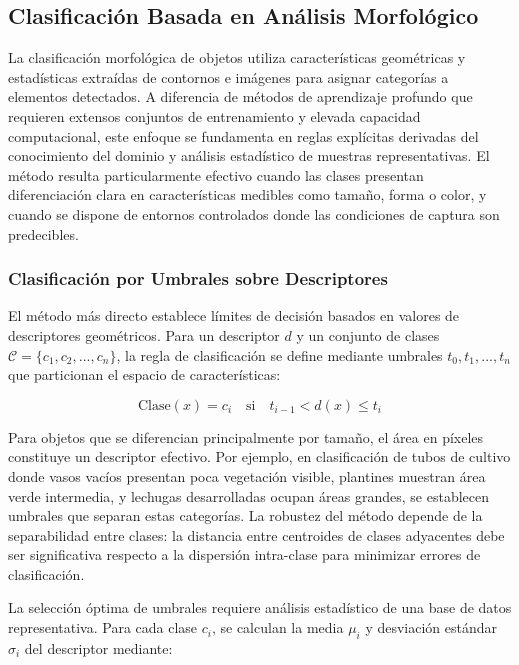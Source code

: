\subsection{Clasificación Basada en Análisis Morfológico}

La clasificación morfológica de objetos utiliza características geométricas y estadísticas extraídas de contornos e imágenes para asignar categorías a elementos detectados. A diferencia de métodos de aprendizaje profundo que requieren extensos conjuntos de entrenamiento y elevada capacidad computacional, este enfoque se fundamenta en reglas explícitas derivadas del conocimiento del dominio y análisis estadístico de muestras representativas. El método resulta particularmente efectivo cuando las clases presentan diferenciación clara en características medibles como tamaño, forma o color, y cuando se dispone de entornos controlados donde las condiciones de captura son predecibles.

\subsubsection{Clasificación por Umbrales sobre Descriptores}

El método más directo establece límites de decisión basados en valores de descriptores geométricos. Para un descriptor $d$ y un conjunto de clases $\mathcal{C} = \{c_1, c_2, ..., c_n\}$, la regla de clasificación se define mediante umbrales $t_0, t_1, ..., t_n$ que particionan el espacio de características:

\begin{equation}
\text{Clase}(x) = c_i \quad \text{si} \quad t_{i-1} < d(x) \leq t_i
\end{equation}

Para objetos que se diferencian principalmente por tamaño, el área en píxeles constituye un descriptor efectivo. Por ejemplo, en clasificación de tubos de cultivo donde vasos vacíos presentan poca vegetación visible, plantines muestran área verde intermedia, y lechugas desarrolladas ocupan áreas grandes, se establecen umbrales que separan estas categorías. La robustez del método depende de la separabilidad entre clases: la distancia entre centroides de clases adyacentes debe ser significativa respecto a la dispersión intra-clase para minimizar errores de clasificación.

La selección óptima de umbrales requiere análisis estadístico de una base de datos representativa. Para cada clase $c_i$, se calculan la media $\mu_i$ y desviación estándar $\sigma_i$ del descriptor mediante:

